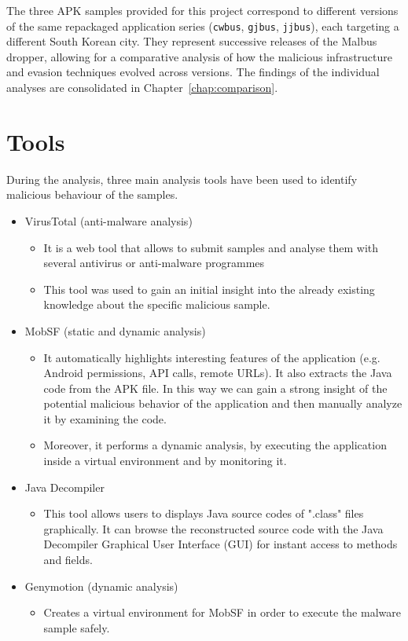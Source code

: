 The three APK samples provided for this project correspond to different versions of the same repackaged application series (\texttt{cwbus}, \texttt{gjbus}, \texttt{jjbus}), each targeting a different South Korean city. They represent successive releases of the Malbus dropper, allowing for a comparative analysis of how the malicious infrastructure and evasion techniques evolved across versions. The findings of the individual analyses are consolidated in Chapter~\ref{chap:comparison}.

\section{Tools}
  During the analysis, three main analysis tools have been used to identify malicious behaviour of the samples.
 \begin{itemize}
     \item VirusTotal  (anti-malware analysis)
     \begin{itemize}
         \item It is a web tool that allows to submit samples and analyse them with several antivirus or anti-malware programmes
         \item This tool was used to gain an initial insight into the already existing knowledge about the specific malicious sample.
     \end{itemize}
     \item MobSF  (static and dynamic analysis)
 \begin{itemize}
     \item It automatically highlights interesting features of the application (e.g. Android permissions, API calls, remote URLs). It also extracts the Java code from the APK file. In this way we can gain a strong insight of the potential malicious behavior of the application and then manually analyze it by examining the code.
 \item Moreover, it performs a dynamic analysis, by executing the application inside a virtual environment and by monitoring it.
 \end{itemize}
 \item Java Decompiler 
\begin{itemize}
    \item This tool allows users to displays Java source codes of ".class" files graphically. It can browse the reconstructed source code with the Java Decompiler Graphical User Interface (GUI) for instant access to methods and fields.
\end{itemize}
 \item Genymotion  (dynamic analysis)
 \begin{itemize}

 \item Creates a virtual environment for MobSF in order to execute the malware sample safely.
 \end{itemize}
 \end{itemize}
